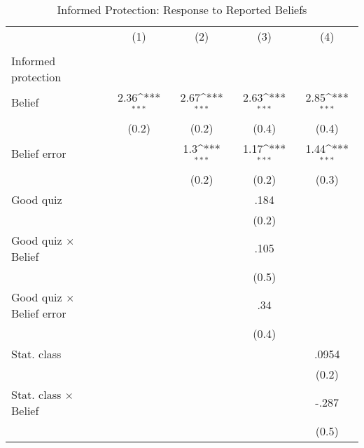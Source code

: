 \begin{table}[htbp]\centering
\def\sym#1{\ifmmode^{#1}\else\(^{#1}\)\fi}
\caption{Informed Protection: Response to Reported Beliefs}
\begin{tabular}{l*{4}{c}}
\hline\hline
                &\multicolumn{1}{c}{(1)}&\multicolumn{1}{c}{(2)}&\multicolumn{1}{c}{(3)}&\multicolumn{1}{c}{(4)}\\
                &\multicolumn{1}{c}{}&\multicolumn{1}{c}{}&\multicolumn{1}{c}{}&\multicolumn{1}{c}{}\\
\hline
Informed protection&                  &                  &                  &                  \\
Belief          &     2.36\sym{***}&     2.67\sym{***}&     2.63\sym{***}&     2.85\sym{***}\\
                &    (0.2)         &    (0.2)         &    (0.4)         &    (0.4)         \\
Belief error    &                  &      1.3\sym{***}&     1.17\sym{***}&     1.44\sym{***}\\
                &                  &    (0.2)         &    (0.2)         &    (0.3)         \\
Good quiz       &                  &                  &     .184         &                  \\
                &                  &                  &    (0.2)         &                  \\
Good quiz $\times$ Belief&                  &                  &     .105         &                  \\
                &                  &                  &    (0.5)         &                  \\
Good quiz $\times$ Belief error&                  &                  &      .34         &                  \\
                &                  &                  &    (0.4)         &                  \\
Stat. class     &                  &                  &                  &    .0954         \\
                &                  &                  &                  &    (0.2)         \\
Stat. class $\times$ Belief&                  &                  &                  &    -.287         \\
                &                  &                  &                  &    (0.5)         \\

\end{tabular}
\end{table}
